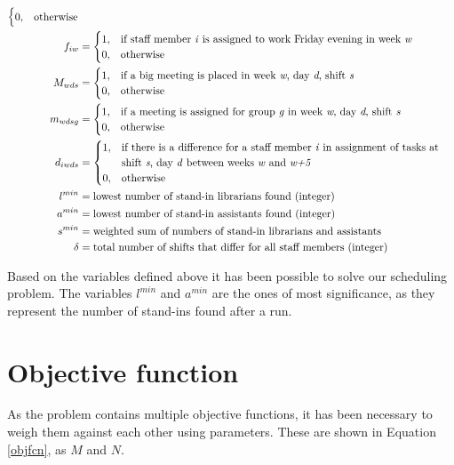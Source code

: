 \begin{align}
\begin{cases}
 		0, & \text{otherwise}
	\end{cases}
	\\
	f_{iw}&=
	\begin{cases}
 		1, & \text{if staff member \textit{i} is assigned to work Friday evening in week \textit{w}} \\
 		0, & \text{otherwise}
	\end{cases}	
	\\
	M_{wds}&=
	\begin{cases}
	 	1, & \text{if a big meeting is placed in week \textit{w}, day \textit{d}, shift \textit{s}} \\
	 	0, & \text{otherwise}
	\end{cases}
	\\
	m_{wdsg}&=
	\begin{cases}
	 	1, & \text{if a meeting is assigned for group \textit{g} in week \textit{w}, day \textit{d}, shift \textit{s}} \\
	 	0, & \text{otherwise}
	\end{cases}
	\\
	d_{iwds}&=
	\begin{cases}
	 	1, & \text{if there is a difference for a staff member \textit{i} in assignment of tasks at }\\
	 		& \text{shift \textit{s}, day \textit{d} between weeks \textit{w} and \textit{w+5}} \\
	 	0, & \text{otherwise}
	\end{cases}
	\\
	l^{min}&= \text{lowest number of stand-in librarians found (integer)} \\
	a^{min}&= \text{lowest number of stand-in assistants found (integer)} \\
	s^{min}&= \text{weighted sum of numbers of stand-in librarians and assistants} \\
	\delta&= \text{total number of shifts that differ for all staff members (integer)}
\end{align}

Based on the variables defined above it has been possible to solve our scheduling problem. The variables \textit{$l^{min}$} and \textit{$a^{min}$} are the ones of most significance, as they represent the number of stand-ins found after a run. 

\section{Objective function} \label{section:obj}
As the problem contains multiple objective functions, it has been necessary to weigh them against each other using parameters. These are shown in Equation \ref{objfcn}, as $M$ and $N$.

